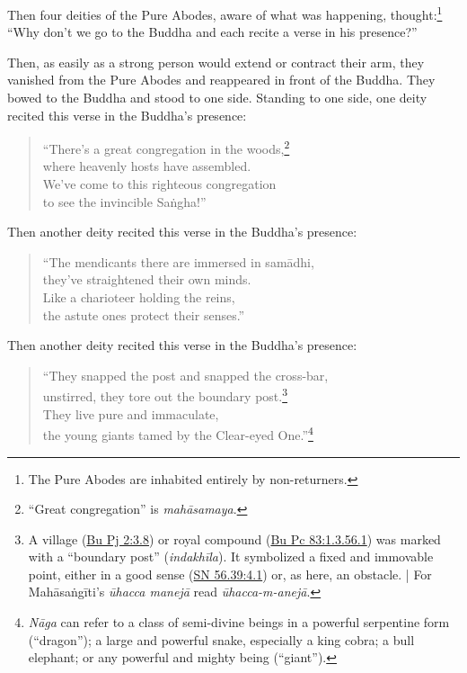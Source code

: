 \documentclass[12pt,openany]{book}%
\begin{document}
Then four deities of the Pure Abodes, aware of what was happening, thought:\footnote{The Pure Abodes are inhabited entirely by non-returners. } “Why don’t we go to the Buddha and each recite a verse in his presence?” 

Then, as easily as a strong person would extend or contract their arm, they vanished from the Pure Abodes and reappeared in front of the Buddha. They bowed to the Buddha and stood to one side. Standing to one side, one deity recited this verse in the Buddha’s presence: 

\begin{verse}%
“There’s a great congregation in the woods,\footnote{“Great congregation” is \textit{\textsanskrit{mahāsamaya}}. } \\
where heavenly hosts have assembled. \\
We’ve come to this righteous congregation \\
to see the invincible \textsanskrit{Saṅgha}!” 

%
\end{verse}

Then another deity recited this verse in the Buddha’s presence: 

\begin{verse}%
“The mendicants there are immersed in \textsanskrit{samādhi}, \\
they’ve straightened their own minds. \\
Like a charioteer holding the reins, \\
the astute ones protect their senses.” 

%
\end{verse}

Then another deity recited this verse in the Buddha’s presence: 

\begin{verse}%
“They snapped the post and snapped the cross-bar, \\
unstirred, they tore out the boundary post.\footnote{A village (\href{https://suttacentral.net/pli-tv-bu-vb-pj2/en/sujato\#3.8}{Bu Pj 2:3.8}) or royal compound (\href{https://suttacentral.net/pli-tv-bu-vb-pc83/en/brahmali\#1.3.56.1}{Bu Pc 83:1.3.56.1}) was marked with a “boundary post” (\textit{\textsanskrit{indakhīla}}). It symbolized a fixed and immovable point, either in a good sense (\href{https://suttacentral.net/sn56.39/en/sujato\#4.1}{SN 56.39:4.1}) or, as here, an obstacle. | For \textsanskrit{Mahāsaṅgīti}’s \textit{\textsanskrit{ūhacca} \textsanskrit{manejā}} read \textit{\textsanskrit{ūhacca}-m-\textsanskrit{anejā}}. } \\
They live pure and immaculate, \\
the young giants tamed by the Clear-eyed One.”\footnote{\textit{\textsanskrit{Nāga}} can refer to a class of semi-divine beings in a powerful serpentine form (“dragon”); a large and powerful snake, especially a king cobra; a bull elephant; or any powerful and mighty being (“giant”). } 

%
\end{verse}
\end{document}
